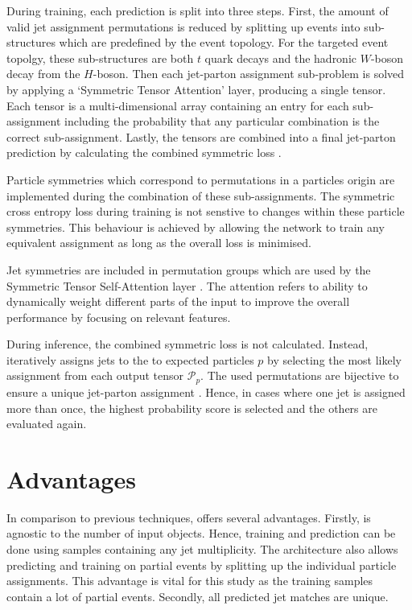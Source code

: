 \documentclass[bachelor,ngerman,english]{GAUBM}
\begin{document}
During training, each prediction is split into three steps. First, the amount of valid jet assignment permutations is reduced by splitting up events into sub-structures which are predefined by the event topology. For the targeted event topolgy, these sub-structures are both $t$ quark decays and the hadronic $W$-boson decay from the $H$-boson. Then each jet-parton assignment sub-problem is solved by applying a `Symmetric Tensor Attention' \cite{spanet_01} layer, producing a single tensor. Each tensor is a multi-dimensional array containing an entry for each sub-assignment including the probability that any particular combination is the correct sub-assignment. Lastly, the tensors are combined into a final jet-parton prediction by calculating the combined symmetric loss \cite{spanet_01}. 

Particle symmetries which correspond to permutations in a particles origin are implemented during the combination of these sub-assignments. The symmetric cross entropy loss during training is not senstive to changes within these particle symmetries. This behaviour is achieved by allowing the network to train any equivalent assignment as long as the overall loss is minimised. 

Jet symmetries are included in permutation groups which are used by the Symmetric Tensor Self-Attention layer \cite{spanet_01}. The attention refers to \spanets ability to dynamically weight different parts of the input to improve the overall performance by focusing on relevant features.

During inference, the combined symmetric loss is not calculated. Instead, \spanet iteratively assigns jets to the to expected particles $p$ by selecting the most likely assignment from each output tensor $\mathcal{P}_p$. The used permutations are bijective to ensure a unique jet-parton assignment \cite{spanet_01}. Hence, in cases where one jet is assigned more than once, the highest probability score is selected and the others are evaluated again.

\section{Advantages}
\label{sec:spanet:advantages}
In comparison to previous techniques, \spanet offers several advantages. Firstly, \spanet is agnostic to the number of input objects. Hence, training and prediction can be done using samples containing any jet multiplicity. The architecture also allows predicting and training on partial events by splitting up the individual particle assignments. This advantage is vital for this study as the training samples contain a lot of partial events. Secondly, all predicted jet matches are unique. 
\end{document}
